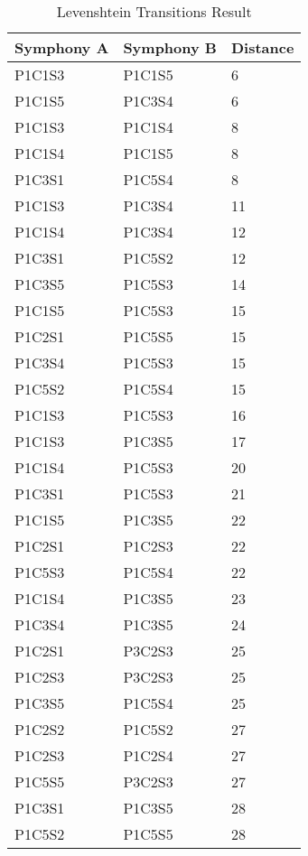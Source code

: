 \begin{longtable}{|l|l|l|}
\caption{Levenshtein Transitions Result}
\label{my-label}\\
\hline
Symphony A & Symphony B & Distance \\ \hline
\endfirsthead
%
\endhead
%
P1C1S3 & P1C1S5 & 6 \\ \hline
P1C1S5 & P1C3S4 & 6 \\ \hline
P1C1S3 & P1C1S4 & 8 \\ \hline
P1C1S4 & P1C1S5 & 8 \\ \hline
P1C3S1 & P1C5S4 & 8 \\ \hline
P1C1S3 & P1C3S4 & 11 \\ \hline
P1C1S4 & P1C3S4 & 12 \\ \hline
P1C3S1 & P1C5S2 & 12 \\ \hline
P1C3S5 & P1C5S3 & 14 \\ \hline
P1C1S5 & P1C5S3 & 15 \\ \hline
P1C2S1 & P1C5S5 & 15 \\ \hline
P1C3S4 & P1C5S3 & 15 \\ \hline
P1C5S2 & P1C5S4 & 15 \\ \hline
P1C1S3 & P1C5S3 & 16 \\ \hline
P1C1S3 & P1C3S5 & 17 \\ \hline
P1C1S4 & P1C5S3 & 20 \\ \hline
P1C3S1 & P1C5S3 & 21 \\ \hline
P1C1S5 & P1C3S5 & 22 \\ \hline
P1C2S1 & P1C2S3 & 22 \\ \hline
P1C5S3 & P1C5S4 & 22 \\ \hline
P1C1S4 & P1C3S5 & 23 \\ \hline
P1C3S4 & P1C3S5 & 24 \\ \hline
P1C2S1 & P3C2S3 & 25 \\ \hline
P1C2S3 & P3C2S3 & 25 \\ \hline
P1C3S5 & P1C5S4 & 25 \\ \hline
P1C2S2 & P1C5S2 & 27 \\ \hline
P1C2S3 & P1C2S4 & 27 \\ \hline
P1C5S5 & P3C2S3 & 27 \\ \hline
P1C3S1 & P1C3S5 & 28 \\ \hline
P1C5S2 & P1C5S5 & 28 \\ \hline
\end{longtable}

